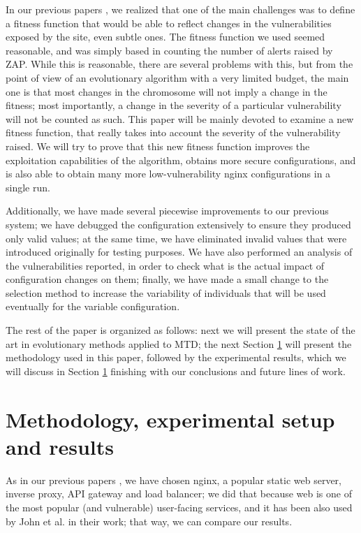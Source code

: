 \documentclass[sigconf]{acmart}
\begin{document}
In our previous papers \cite{erseco:evostar:anon,erseco:cec}, we realized that one of the main challenges
was to define a fitness function that would be able to reflect changes
in the vulnerabilities exposed by the site, even subtle ones. The
fitness function we used seemed reasonable, and was simply based in
counting the number of alerts raised by ZAP. While this is reasonable,
there are several problems with this, but from the point of view of an
evolutionary algorithm with a very limited budget, the main one is
that most changes in the chromosome will not imply a change in the
fitness; most importantly, a change in the severity of a particular
vulnerability will not be counted as such. This paper will be mainly
devoted to examine a new fitness function, that really takes into
account the severity of the vulnerability raised. We will try to prove
that this new fitness function improves the exploitation capabilities
of the algorithm, obtains more secure configurations, and is also able
to obtain many more low-vulnerability {\sf nginx} configurations in a
single run.

Additionally, we have made several piecewise improvements to our
previous system; we have debugged the configuration extensively to
ensure they produced only valid values; at the same time, we have
eliminated invalid values that were introduced originally for testing
purposes. We have also performed an analysis of the vulnerabilities
reported, in order to check what is the actual impact of configuration
changes on them; finally, we have made a small change to the selection
method to increase the variability of individuals that will be used
eventually for the variable configuration.

The rest of the paper is organized as follows: next we will present
the state of the art in evolutionary methods applied to MTD; the next
Section \ref{sec:met} will present the methodology used in this paper,
followed by the experimental results, which we will discuss in Section \ref{sec:met}
finishing with our conclusions and future lines of work.


\section{Methodology, experimental setup and results}
\label{sec:met}


As in our previous papers \cite{erseco:evostar:anon,erseco:cec}, we have chosen
{\sf nginx}, a  popular static web server, inverse proxy, API gateway
and load balancer; we did that because web is one of the most popular
(and vulnerable) user-facing services, and it has been also used by
John et al. in their work; that way, we can compare our results.
\end{document}
